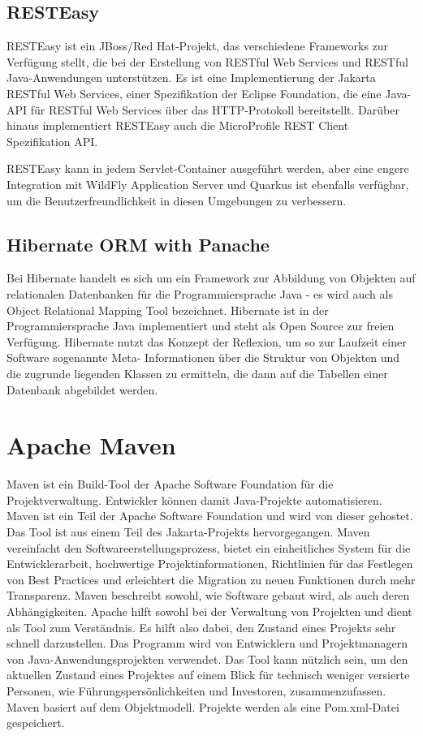 \subsection{RESTEasy}

RESTEasy ist ein JBoss/Red Hat-Projekt, das verschiedene Frameworks zur Verfügung stellt, die bei der Erstellung von RESTful Web Services und RESTful Java-Anwendungen unterstützen. 
Es ist eine Implementierung der Jakarta RESTful Web Services, einer Spezifikation der Eclipse Foundation, die eine Java-API für RESTful Web Services über das HTTP-Protokoll bereitstellt.
Darüber hinaus implementiert RESTEasy auch die MicroProfile REST Client Spezifikation API.

RESTEasy kann in jedem Servlet-Container ausgeführt werden, aber eine engere Integration mit WildFly Application Server und Quarkus 
ist ebenfalls verfügbar, um die Benutzerfreundlichkeit in diesen Umgebungen zu verbessern.
\cite{sysarch-quarkus-2}

\subsection{Hibernate ORM with Panache}

Bei Hibernate handelt es sich um ein Framework zur Abbildung von Objekten auf relationalen Datenbanken für die Programmiersprache Java - es wird auch als Object Relational Mapping Tool bezeichnet. 
Hibernate ist in der Programmiersprache Java implementiert und steht als Open Source zur freien Verfügung. Hibernate nutzt das Konzept der Reflexion, um so zur Laufzeit einer Software sogenannte 
Meta- Informationen über die Struktur von Objekten und die zugrunde liegenden Klassen zu ermitteln, die dann auf die Tabellen einer Datenbank abgebildet werden.
\cite{sysarch-quarkus-3}

\section{Apache Maven}

Maven ist ein Build-Tool der Apache Software Foundation für die Projektverwaltung. Entwickler können damit Java-Projekte automatisieren. Maven ist ein Teil der Apache Software Foundation und wird von dieser gehostet. 
Das Tool ist aus einem Teil des Jakarta-Projekts hervorgegangen. Maven vereinfacht den Softwareerstellungsprozess, bietet ein einheitliches System für die Entwicklerarbeit, hochwertige Projektinformationen, 
Richtlinien für das Festlegen von Best Practices und erleichtert die Migration zu neuen Funktionen durch mehr Transparenz. Maven beschreibt sowohl, wie Software gebaut wird, als auch deren Abhängigkeiten. 
Apache hilft sowohl bei der Verwaltung von Projekten und dient als Tool zum Verständnis. Es hilft also dabei, den Zustand eines Projekts sehr schnell darzustellen.
Das Programm wird von Entwicklern und Projektmanagern von Java-Anwendungsprojekten verwendet. Das Tool kann nützlich sein, um den aktuellen Zustand eines Projektes 
auf einem Blick für technisch weniger versierte Personen, wie Führungspersönlichkeiten und Investoren, zusammenzufassen. Maven basiert auf dem Objektmodell. 
Projekte werden als eine Pom.xml-Datei gespeichert. 

